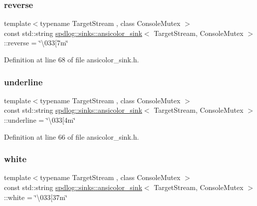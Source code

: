 \subsubsection{\texorpdfstring{reverse}{reverse}}
{\footnotesize\ttfamily template$<$typename Target\+Stream , class Console\+Mutex $>$ \\
const std\+::string \hyperlink{classspdlog_1_1sinks_1_1ansicolor__sink}{spdlog\+::sinks\+::ansicolor\+\_\+sink}$<$ Target\+Stream, Console\+Mutex $>$\+::reverse = \char`\"{}\textbackslash{}033\mbox{[}7m\char`\"{}}



Definition at line 68 of file ansicolor\+\_\+sink.\+h.

\mbox{\label{classspdlog_1_1sinks_1_1ansicolor__sink_a22d86f2cb36da074052308603f058764}} 
\subsubsection{\texorpdfstring{underline}{underline}}
{\footnotesize\ttfamily template$<$typename Target\+Stream , class Console\+Mutex $>$ \\
const std\+::string \hyperlink{classspdlog_1_1sinks_1_1ansicolor__sink}{spdlog\+::sinks\+::ansicolor\+\_\+sink}$<$ Target\+Stream, Console\+Mutex $>$\+::underline = \char`\"{}\textbackslash{}033\mbox{[}4m\char`\"{}}



Definition at line 66 of file ansicolor\+\_\+sink.\+h.

\mbox{\label{classspdlog_1_1sinks_1_1ansicolor__sink_a74514f96774a00d0a7300b7a625c5044}} 
\subsubsection{\texorpdfstring{white}{white}}
{\footnotesize\ttfamily template$<$typename Target\+Stream , class Console\+Mutex $>$ \\
const std\+::string \hyperlink{classspdlog_1_1sinks_1_1ansicolor__sink}{spdlog\+::sinks\+::ansicolor\+\_\+sink}$<$ Target\+Stream, Console\+Mutex $>$\+::white = \char`\"{}\textbackslash{}033\mbox{[}37m\char`\"{}}




